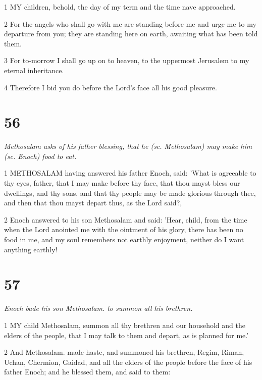 \par 1 MY children, behold, the day of my term and the time nave approached.

\par 2 For the angels who shall go with me are standing before me and urge me to my departure from you; they are standing here on earth, awaiting what has been told them.

\par 3 For to-morrow I shall go up on to heaven, to the uppermost Jerusalem to my eternal inheritance.

\par 4 Therefore I bid you do before the Lord's face all his good pleasure.

\chapter{56}

\par \textit{Methosalam asks of his father blessing, that he (sc. Methosalam) may make him (sc. Enoch) food to eat.}

\par 1 METHOSALAM having answered his father Enoch, said: 'What is agreeable to thy eyes, father, that I may make before thy face, that thou mayst bless our dwellings, and thy sons, and that thy people may be made glorious through thee, and then that thou mayst depart thus, as the Lord said?,

\par 2 Enoch answered to his son Methosalam and said: 'Hear, child, from the time when the Lord anointed me with the ointment of his glory, there has been no food in me, and my soul remembers not earthly enjoyment, neither do I want anything earthly!

\chapter{57}

\par \textit{Enoch bade his son Methosalam. to summon all his brethren.}

\par 1 MY child Methosalam, summon all thy brethren and our household and the elders of the people, that I may talk to them and depart, as is planned for me.'

\par 2 And Methosalam. made haste, and summoned his brethren, Regim, Riman, Uchan, Chermion, Gaidad, and all the elders of the people before the face of his father Enoch; and he blessed them, and said to them:

